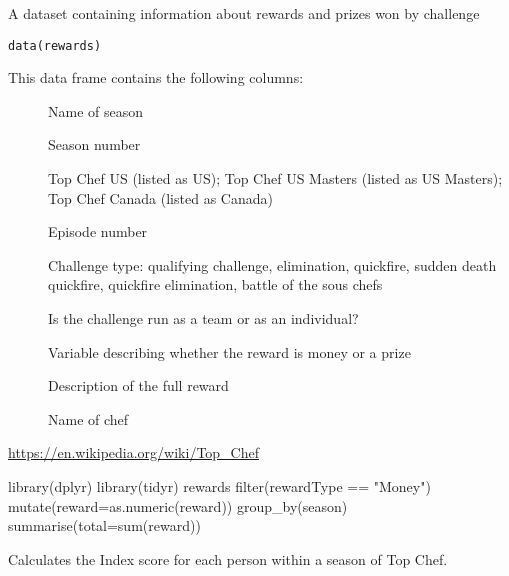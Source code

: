 \documentclass[a4paper]{book}
\begin{document}
%
\begin{Description}
A dataset containing information about rewards and prizes won by challenge
\end{Description}
%
\begin{Usage}
\begin{verbatim}
data(rewards)
\end{verbatim}
\end{Usage}
%
\begin{Format}
This data frame contains the following columns:
\begin{description}

\item[] Name of season
\item[] Season number
\item[] Top Chef US (listed as US); Top Chef US Masters
(listed as US Masters); Top Chef Canada (listed as Canada)
\item[] Episode number
\item[] Challenge type: qualifying challenge,
elimination, quickfire, sudden death quickfire, quickfire elimination,
battle of the sous chefs
\item[] Is the challenge run as a team or as an
individual?
\item[] Variable describing whether the reward is
money or a prize
\item[] Description of the full reward
\item[] Name of chef

\end{description}

\end{Format}
%
\begin{Source}
\url{https://en.wikipedia.org/wiki/Top_Chef}
\end{Source}
%
\begin{Examples}
\begin{ExampleCode}
library(dplyr)
library(tidyr)
rewards %
  filter(rewardType == "Money") %
  mutate(reward=as.numeric(reward)) %
  group_by(season) %
  summarise(total=sum(reward))
\end{ExampleCode}
\end{Examples}
%
\begin{Description}
Calculates the Index score for each person within a season of
Top Chef.
\end{Description}
\end{document}

